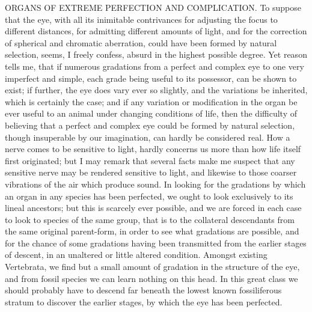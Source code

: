 ORGANS OF EXTREME PERFECTION AND COMPLICATION.
To suppose that the eye, with all its inimitable contrivances for adjusting the focus to different distances, for admitting different amounts of light, and for the correction of spherical and chromatic aberration, could have been formed by natural selection, seems, I freely confess, absurd in the highest possible degree. Yet reason tells me, that if numerous gradations from a perfect and complex eye to one very imperfect and simple, each grade being useful to its possessor, can be shown to exist; if further, the eye does vary ever so slightly, and the variations be inherited, which is certainly the case; and if any variation or modification in the organ be ever useful to an animal under changing conditions of life, then the difficulty of believing that a perfect and complex eye could be formed by natural selection, though insuperable by our imagination, can hardly be considered real. How a nerve comes to be sensitive to light, hardly concerns us more than how life itself first originated; but I may remark that several facts make me suspect that any sensitive nerve may be rendered sensitive to light, and likewise to those coarser vibrations of the air which produce sound.
In looking for the gradations by which an organ in any species has been perfected, we ought to look exclusively to its lineal ancestors; but this is scarcely ever possible, and we are forced in each case to look to species of the same group, that is to the collateral descendants from the same original parent-form, in order to see what gradations are possible, and for the chance of some gradations having been transmitted from the earlier stages of descent, in an unaltered or little altered condition. Amongst existing Vertebrata, we find but a small amount of gradation in the structure of the eye, and from fossil species we can learn nothing on this head. In this great class we should probably have to descend far beneath the lowest known fossiliferous stratum to discover the earlier stages, by which the eye has been perfected.
